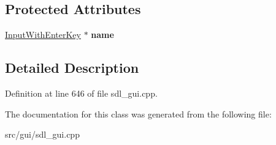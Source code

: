 \subsection*{Protected Attributes}
\begin{DoxyCompactItemize}
\item 
\hypertarget{classSetCycles_ad75bca3a041f5aa2d66ede78b1f563c9}{\hyperlink{classInputWithEnterKey}{Input\-With\-Enter\-Key} $\ast$ {\bfseries name}}\label{classSetCycles_ad75bca3a041f5aa2d66ede78b1f563c9}

\end{DoxyCompactItemize}


\subsection{Detailed Description}


Definition at line 646 of file sdl\-\_\-gui.\-cpp.



The documentation for this class was generated from the following file\-:\begin{DoxyCompactItemize}
\item 
src/gui/sdl\-\_\-gui.\-cpp\end{DoxyCompactItemize}
